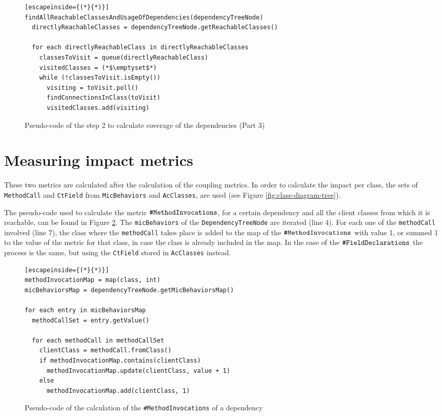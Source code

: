 \begin{figure}[ht!]
\begin{lstlisting}[escapeinside={(*}{*)}]
findAllReachableClassesAndUsageOfDependencies(dependencyTreeNode)
  directlyReachableClasses = dependencyTreeNode.getReachableClasses()

  for each directlyReachableClass in directlyReachableClasses
    classesToVisit = queue(directlyReachableClass)
    visitedClasses = (*$\emptyset$*)
    while (!classesToVisit.isEmpty())
      visiting = toVisit.poll()
      findConnectionsInClass(toVisit)
      visitedClasses.add(visiting)
\end{lstlisting}
\caption{Pseudo-code of the step 2 to calculate coverage of the dependencies (Part 3)}
\label{fig:algorithm-usage-step2-3}
\end{figure}

\section{Measuring impact metrics}
These two metrics are calculated after the calculation of the coupling metrics. In order to calculate the impact per class, the sets of \texttt{MethodCall} and \texttt{CtField} from \texttt{MicBehaviors} and \texttt{AcClasses}, are used (see Figure \ref{fig:class-diagram-tree}).

The pseudo-code used to calculate the metric $\verb|#MethodInvocations|$, for a certain dependency and all the client classes from which it is reachable, can be found in Figure \ref{fig:algorithm-method-invocations}. The \texttt{micBehaviors} of the \texttt{DependencyTreeNode} are iterated (line 4). For each one of the \texttt{methodCall} involved (line 7), the class where the \texttt{methodCall} takes place is added to the map of the $\verb|#MethodInvocations|$ with value 1, or summed 1 to the value of the metric for that class, in case the class is already included in the map. In the case of the $\verb|#FieldDeclarations|$ the process is the same, but using the \texttt{CtField} stored in \texttt{AcClasses} instead.

\begin{figure}[ht!]
\begin{lstlisting}[escapeinside={(*}{*)}]
methodInvocationMap = map(class, int)
micBehaviorsMap = dependencyTreeNode.getMicBehaviorsMap()

for each entry in micBehaviorsMap
  methodCallSet = entry.getValue()

  for each methodCall in methodCallSet
    clientClass = methodCall.fromClass()
    if methodInvocationMap.contains(clientClass)
      methodInvocationMap.update(clientClass, value + 1)
    else
      methodInvocationMap.add(clientClass, 1)
\end{lstlisting}
\caption{Pseudo-code of the calculation of the \texttt{\#MethodInvocations} of a dependency}
\label{fig:algorithm-method-invocations}
\end{figure}

